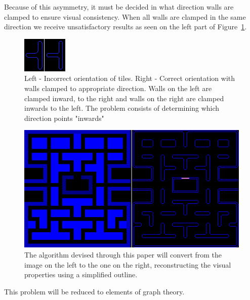 Because of this asymmetry, it must be decided in what direction walls are clamped to ensure visual consistency. When all walls are clamped in the same direction we receive unsatisfactory results as seen on the left part of Figure~\ref{WallTextureAsymmetry}. 

\begin{figure}[H]
\centering
\includegraphics[width=0.4\linewidth]{Image-4.png}
\caption {Left - Incorrect orientation of tiles. Right - Correct orientation with walls clamped to appropriate direction. Walls on the left are clamped inward, to the right and walls on the right are clamped inwards to the left. The problem consists of determining which direction points "inwards"\autocite{myself}}\label{WallTextureAsymmetry}
\end{figure}

\begin{figure}[H]
\centering
\includegraphics[width=0.8\linewidth]{Image-5.png}
\caption {The algorithm devised through this paper will convert from the image on the left to the one on the right, reconstructing the visual properties using a simplified outline.\autocite{myself}}\label{LevelWallConversion}
\end{figure}

This problem will be reduced to elements of graph theory.